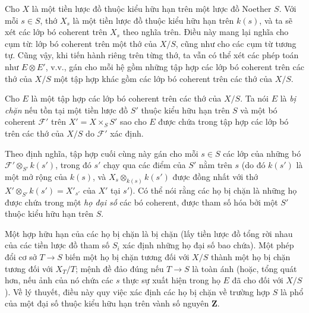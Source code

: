 Cho $X$ là một tiền lược đồ thuộc kiểu hữu hạn trên một lược đồ Noether $S$.
Với mỗi $s\in S$, thớ $X_s$ là một tiền lược đồ thuộc kiểu hữu hạn trên
$k(s)$, và ta sẽ xét các lớp bó coherent trên $X_s$ theo nghĩa trên. Điều này
mang lại nghĩa cho cụm từ: lớp bó coherent trên một thớ của $X/S$, cũng như
cho các cụm từ tương tự. Cũng vậy, khi tiến hành riêng trên từng thớ, ta vẫn có
thể xét các phép toán như $E\otimes E'$, v.v., gán cho mỗi hệ gồm những tập hợp
các lớp bó coherent trên các thớ của $X/S$ một tập hợp khác gồm các lớp bó
coherent trên các thớ của $X/S$.

 Cho $E$ là một tập hợp các lớp bó coherent trên các
thớ của $X/S$. Ta nói $E$ là \emph{bị chặn} nếu tồn tại một tiền lược đồ $S'$
thuộc kiểu hữu hạn trên $S$ và một bó coherent $\mathcal F'$ trên
$X'=X\times_S S'$ sao cho $E$ được chứa trong tập hợp các lớp bó trên các thớ
của $X/S$ do $\mathcal F'$ xác định.

Theo định nghĩa, tập hợp cuối cùng này gán cho mỗi $s\in S$ các lớp của những bó
$\mathcal F'\otimes_{S'}k(s')$, trong đó $s'$ chạy qua các điểm của $S'$ nằm
trên $s$ (do đó $k(s')$ là một mở rộng của $k(s)$, và
$X_s\otimes_{k(s)}k(s')$ được đồng nhất với thớ
$X'\otimes_{S'}k(s')=X'_{s'}$ của $X'$ tại $s'$). Có thể nói rằng các họ bị
chặn là những họ được chứa trong một \emph{họ đại số} các bó coherent, được
tham số hóa bởi một $S'$ thuộc kiểu hữu hạn trên $S$.

Một hợp hữu hạn của các họ bị chặn là bị chặn (lấy tiền lược đồ tổng rời nhau
của các tiền lược đồ tham số $S_i$ xác định những họ đại số bao chứa). Một phép
đổi cơ sở $T\longrightarrow S$ biến một họ bị chặn tương đối với $X/S$ thành
một họ bị chặn tương đối với $X_T/T$; mệnh đề đảo đúng nếu
$T\longrightarrow S$ là toàn ánh (hoặc, tổng quát hơn, nếu ảnh của nó chứa các
$s$ thực sự xuất hiện trong họ $E$ đã cho đối với $X/S$). Về lý thuyết, điều
này quy việc xác định các họ bị chặn về trường hợp $S$ là phổ của một đại số
thuộc kiểu hữu hạn trên vành số nguyên $\mathbf Z$.

